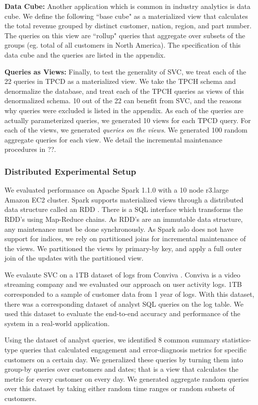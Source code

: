\textbf{Data Cube: } Another application which is common in industry analytics is data cube.
We define the following ``base cube" as a materialized view that calculates the total revenue 
grouped by distinct customer, nation, region, and part number.
The queries on this view are ``rollup" queries that aggregate over 
subsets of the groups (eg. total of all customers in North America).
The specification of this data cube and the queries are listed in the appendix.

\textbf{Queries as Views: } Finally, to test the generality of SVC, we treat each of the 22 queries in TPCD as a materialized view.
We take the TPCH schema and denormalize the database, and treat each of the TPCH queries as views of this denormalized schema. 
10 out of the 22 can benefit from SVC, and the reasons why queries were excluded is listed in the appendix.
As each of the queries are actually parameterized queries, we generated 10 views for each TPCD query.
For each of the views, we generated \emph{queries on the views}.
We generated 100 random aggregate queries for each view.
We detail the incremental maintenance procedures in ??.

\subsubsection{Distributed Experimental Setup}
We evaluated performance on Apache Spark 1.1.0 with a 10 node r3.large Amazon EC2 cluster.
Spark supports materialized views through a distributed data structure called an RDD \cite{zaharia2012resilient}.
There is a SQL interface which transforms the RDD's using Map-Reduce chains.
As RDD's are an immutable data structure, any maintenance must be done synchronously.
As Spark aslo does not have support for indices, we rely on partitioned joins for incremental maintenance of the views.
We partitioned the views by primary-by key, and apply a full outer join of the updates with the partitioned view.

We evalaute SVC on a 1TB dataset of logs from Conviva \cite{conviva}.
Conviva is a video streaming company and we evaluated our approach on user activity logs.
1TB corresponded to a sample of customer data from 1 year of logs.
With this dataset, there was a corresponding dataset of analyst SQL queries on the log table.
We used this dataset to evaluate the end-to-end accuracy and performance of the system in a real-world application.

Using the dataset of analyst queries, we identified 8 common summary statistics-type queries that calculated engagement and error-diagnosis metrics for specific customers on a certain day.
We generalized these queries by turning them into group-by queries over customers and dates; that is a view that calculates the metric for every customer on every day.
We generated aggregate random queries over this dataset by taking either random time ranges or random subsets of customers.

